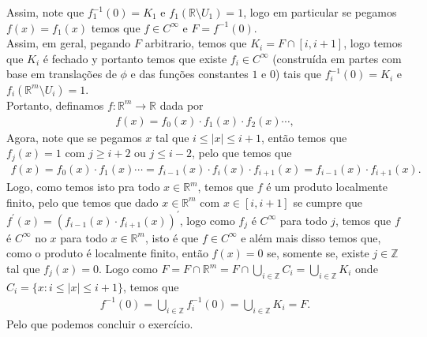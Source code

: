 \begin{homeworkProblem}[Seção 1-7]
\begin{solution}
\begin{center}
    \end{center}
    Assim, note que $f_1^{-1}(0)=K_1$ e $f_1\left( \mathbb{R}\setminus U_1 \right)=1$, logo em particular se pegamos $f(x)=f_1(x)$ temos que $f\in C^{\infty}$ e $F=f^{-1}(0)$.\\
    Assim, em geral, pegando $F$ arbitrario, temos que $K_i=F\cap [i,i+1]$, logo temos que $K_i$ é fechado y portanto temos que existe $f_i\in C^{\infty}$ (construída em partes com base em translações de $\phi$ e das funções constantes $1$ e $0$) tais que $f_i^{-1}(0)=K_i$ e $f_i(\mathbb{R}^{m}\setminus U_i)=1$.\\
    Portanto, definamos $f:\mathbb{R}^{m}\to\mathbb{R}$ dada por
    \begin{align*}
      f(x)=f_0(x)\cdot f_1(x)\cdot f_2(x)\cdots,
    \end{align*}
    Agora, note que se pegamos $x$ tal que $i\leq |x|\leq i+1$, então temos que $f_{j}(x)=1$ com $j\geq i+2$ ou $j\leq i-2$, pelo que temos que
    \begin{align*}
      f(x)=f_0(x)\cdot f_1(x)\cdots= f_{i-1}(x)\cdot f_{i}(x)\cdot f_{i+1}(x)=f_{i-1}(x)\cdot f_{i+1}(x).
    \end{align*}
    Logo, como temos isto pra todo $x\in\mathbb{R}^{m}$, temos que $f$ é um produto localmente finito, pelo que temos que dado $x\in\mathbb{R}^{m}$ com $x\in [i,i+1]$ se cumpre que  $f^{\prime}(x)=(f_{i-1}(x)\cdot f_{i+1}(x))^{\prime}$, logo como $f_j$ é $C^{\infty}$ para todo $j$, temos que $f$ é $C^{\infty}$ no $x$ para todo $x\in\mathbb{R}^{m}$, isto é que $f\in C^{\infty}$ e além mais disso temos que, como o produto é localmente finito, então $f(x)=0$ se, somente se, existe $j\in\mathbb{Z}$ tal que $f_{j}(x)=0$. Logo como $F=F\cap \mathbb{R}^{m}=F\cap \bigcup_{i\in\mathbb{Z}}C_i=\bigcup_{i\in\mathbb{Z}}K_i$ onde $C_i=\{x:i\leq |x|\leq i+1\}$, temos que 
    \begin{align*}
      f^{-1}(0)=\bigcup_{i\in\mathbb{Z}}f_{i}^{-1}(0)=\bigcup_{i\in\mathbb{Z}}K_i=F.
    \end{align*}
    Pelo que podemos concluir o exercício.
  \end{solution}
\end{homeworkProblem}
